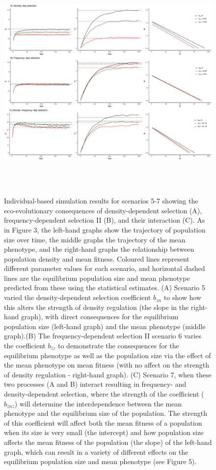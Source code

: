 \documentclass{article}
\begin{document}
\begin{figure}[h] 
	\centering
	\includegraphics[width=16cm, height=12cm]{Figures/Fig4.pdf}
	\caption{Individual-based simulation results for scenarios 5-7 showing the eco-evolutionary consequences of density-dependent selection (A), frequency-dependent selection II (B), and their interaction (C). As in Figure 3, the left-hand graphs show the trajectory of population size over time, the middle graphs the trajectory of the mean phenotype, and the right-hand graphs the relationship between population density and mean fitness. Coloured lines represent different parameter values for each scenario, and horizontal dashed lines are the equilibrium population size and mean phenotype predicted from these using the statistical estimates. (A) Scenario 5 varied the density-dependent selection coefficient $b_{zn}$ to show how this alters the strength of density regulation (the slope in the right-hand graph), with direct consequences for the equilibrium population size (left-hand graph) and the mean phenotype (middle graph).(B) The frequency-dependent selection II scenario 6 varies the coefficient $b_{\bar{z}z}$ to demonstrate the consequences for the equilibrium phenotype as well as the population size via the effect of the mean phenotype on mean fitness (with no affect on the strength of density regulation - right-hand graph). (C) Scenario 7, when these two processes (A and B) interact resulting in frequency- and density-dependent selection, where the strength of the  coefficient ($b_{\bar{z}nz}$) will determine the interdependence between the mean phenotype and the equilibrium size of the population. The strength of this coefficient will affect both the mean fitness of a population when its size is very small (the intercept) and how population size affects the mean fitness of the population (the slope) of  the left-hand graph, which can result in a variety of different effects on the equilibrium population size and mean phenotype (see Figure 5).} 
	\label{fig:sim3}
\end{figure}
\end{document}
